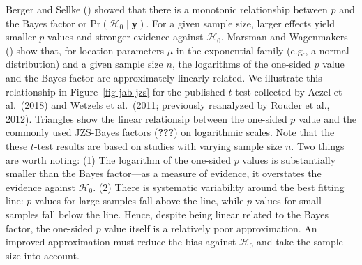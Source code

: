 \documentclass[
  man,
  floatsintext,
  longtable,
  nolmodern,
  notxfonts,
  notimes,
  colorlinks=true,linkcolor=blue,citecolor=blue,urlcolor=blue]{apa7}
\begin{document}
Berger and Sellke () showed that there is
a monotonic relationship between \(p\) and the Bayes factor or
\(\text{Pr}(\mathcal{H}_0 \mid \mathbf{y})\). For a given sample size,
larger effects yield smaller \(p\) values and stronger evidence against
\(\mathcal{H}_0\). Marsman and Wagenmakers
() show that, for location parameters
\(\mu\) in the exponential family (e.g., a normal distribution) and a
given sample size \(n\), the logarithms of the one-sided \(p\) value and
the Bayes factor are approximately linearly related. We illustrate this
relationship in Figure~\ref{fig-jab-jzs} for the published \(t\)-test
collected by Aczel et al.~(2018) and Wetzels et al.~(2011; previously
reanalyzed by Rouder et al., 2012). Triangles show the linear
relationsip between the one-sided \(p\) value and the commonly used
JZS-Bayes factors (\textbf{???}) on logarithmic scales. Note that the
these \(t\)-test results are based on studies with varying sample size
\(n\). Two things are worth noting: (1) The logarithm of the one-sided
\(p\) values is substantially smaller than the Bayes factor---as a
measure of evidence, it overstates the evidence against
\(\mathcal{H}_0\). (2) There is systematic variability around the best
fitting line: \(p\) values for large samples fall above the line, while
\(p\) values for small samples fall below the line. Hence, despite being
linear related to the Bayes factor, the one-sided \(p\) value itself is
a relatively poor approximation. An improved approximation must reduce
the bias against \(\mathcal{H}_0\) and take the sample size into
account.
\end{document}
